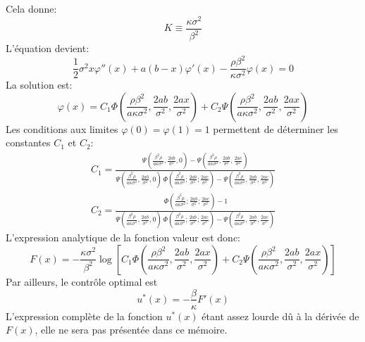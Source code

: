 Cela donne:
\[
K\equiv\frac{\kappa \sigma^2}{\beta^2}
\]
L'équation devient:
\begin{equation}\label{eq_exemple1}
    \frac{1}{2}\sigma^2 x\varphi''(x) + a(b - x)\varphi'(x) - \frac{\rho\beta^2}{\kappa \sigma^2}\varphi(x) = 0
\end{equation}
La solution est:
\[
\varphi(x)=C_1\Phi\left(\frac{\rho\beta^2}{a\kappa \sigma^2},\frac{2ab}{\sigma^2},\frac{2ax}{\sigma^2}\right) + C_2\Psi\left(\frac{\rho\beta^2}{a\kappa \sigma^2},\frac{2ab}{\sigma^2},\frac{2ax}{\sigma^2}\right)
\]
Les conditions aux limites $\varphi(0)=\varphi(1)=1$ permettent de déterminer les constantes $C_1$ et $C_2$:
\begin{equation}\label{control_constants}
    \begin{aligned}
        C_1=\frac{\Psi\left(\frac{\beta ^2 \rho }{a \kappa  \sigma ^2},\frac{2 a b}{\sigma ^2},0\right)-\Psi\left(\frac{\beta ^2 \rho }{a \kappa  \sigma ^2},\frac{2 a b}{\sigma ^2},\frac{2 a c}{\sigma ^2}\right)}{\Psi\left(\frac{\beta ^2 \rho }{a \kappa  \sigma ^2},\frac{2 a b}{\sigma ^2},0\right) \, \Phi\left(\frac{\beta ^2 \rho }{a \kappa  \sigma ^2};\frac{2 a b}{\sigma ^2};\frac{2 a c}{\sigma ^2}\right)-\Psi\left(\frac{\beta ^2 \rho }{a \kappa  \sigma ^2},\frac{2 a b}{\sigma ^2},\frac{2 a c}{\sigma ^2}\right)} \\
        C_2= \frac{\, \Phi\left(\frac{\beta ^2 \rho }{a \kappa  \sigma ^2};\frac{2 a b}{\sigma ^2};\frac{2 a c}{\sigma ^2}\right)-1}{\Psi\left(\frac{\beta ^2 \rho }{a \kappa  \sigma ^2},\frac{2 a b}{\sigma ^2},0\right) \, \Phi\left(\frac{\beta ^2 \rho }{a \kappa  \sigma ^2};\frac{2 a b}{\sigma ^2};\frac{2 a c}{\sigma ^2}\right)-\Psi\left(\frac{\beta ^2 \rho }{a \kappa  \sigma ^2},\frac{2 a b}{\sigma ^2},\frac{2 a c}{\sigma ^2}\right)}
    \end{aligned}
\end{equation}
L'expression analytique de la fonction valeur est donc:
\begin{equation}\label{sol_control_1}
    F(x)=-\frac{\kappa \sigma^2}{\beta^2} \log\left[C_1\Phi\left(\frac{\rho\beta^2}{a\kappa \sigma^2},\frac{2ab}{\sigma^2},\frac{2ax}{\sigma^2}\right) + C_2\Psi\left(\frac{\rho\beta^2}{a\kappa \sigma^2},\frac{2ab}{\sigma^2},\frac{2ax}{\sigma^2}\right)\right]
\end{equation}
Par ailleurs, le contrôle optimal est
\begin{equation}\label{optimal_control_1}
    u^*(x)=-\frac{\beta}{\kappa}F'(x)
\end{equation}
L'expression complète de la fonction $u^*(x)$ étant assez lourde dû à la dérivée de $F(x)$, elle ne sera pas présentée dans ce mémoire.
